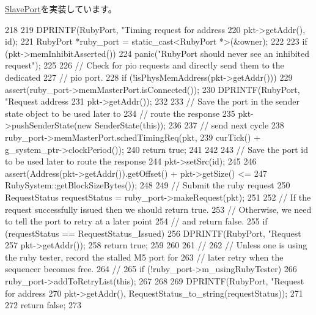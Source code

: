 \hyperlink{classSlavePort_abcece77e42f88ee41af8d3d01bb48253}{SlavePort}を実装しています。


\begin{DoxyCode}
218 {
219     DPRINTF(RubyPort, "Timing request for address %
220             pkt->getAddr(), id);
221     RubyPort *ruby_port = static_cast<RubyPort *>(&owner);
222 
223     if (pkt->memInhibitAsserted())
224         panic("RubyPort should never see an inhibited request\n");
225 
226     // Check for pio requests and directly send them to the dedicated
227     // pio port.
228     if (!isPhysMemAddress(pkt->getAddr())) {
229         assert(ruby_port->memMasterPort.isConnected());
230         DPRINTF(RubyPort, "Request address %
231                 pkt->getAddr());
232 
233         // Save the port in the sender state object to be used later to
234         // route the response
235         pkt->pushSenderState(new SenderState(this));
236 
237         // send next cycle
238         ruby_port->memMasterPort.schedTimingReq(pkt,
239             curTick() + g_system_ptr->clockPeriod());
240         return true;
241     }
242 
243     // Save the port id to be used later to route the response
244     pkt->setSrc(id);
245 
246     assert(Address(pkt->getAddr()).getOffset() + pkt->getSize() <=
247            RubySystem::getBlockSizeBytes());
248 
249     // Submit the ruby request
250     RequestStatus requestStatus = ruby_port->makeRequest(pkt);
251 
252     // If the request successfully issued then we should return true.
253     // Otherwise, we need to tell the port to retry at a later point
254     // and return false.
255     if (requestStatus == RequestStatus_Issued) {
256         DPRINTF(RubyPort, "Request %
257                 pkt->getAddr());
258         return true;
259     }
260 
261     //
262     // Unless one is using the ruby tester, record the stalled M5 port for 
263     // later retry when the sequencer becomes free.
264     //
265     if (!ruby_port->m_usingRubyTester) {
266         ruby_port->addToRetryList(this);
267     }
268 
269     DPRINTF(RubyPort, "Request for address %
270             pkt->getAddr(), RequestStatus_to_string(requestStatus));
271 
272     return false;
273 }
\end{DoxyCode}


